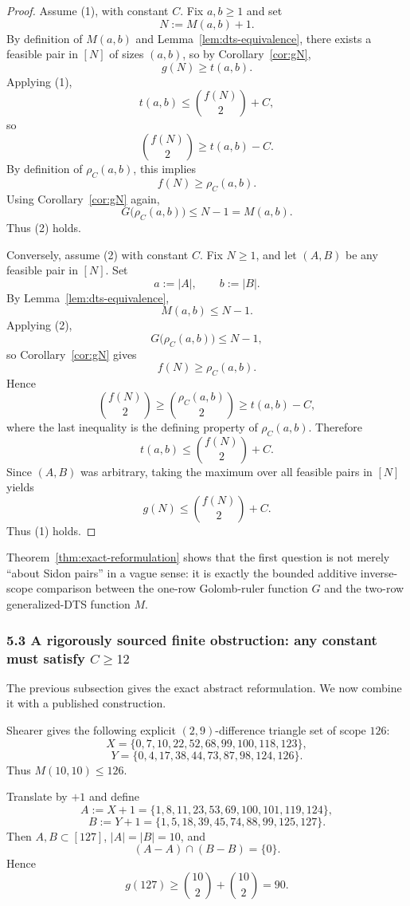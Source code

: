 \begin{proof}
Assume (1), with constant $C$. Fix $a,b\ge 1$ and set
\[
N:=M(a,b)+1.
\]
By definition of $M(a,b)$ and Lemma~\ref{lem:dts-equivalence}, there exists a feasible pair in $[N]$ of sizes $(a,b)$, so by Corollary~\ref{cor:gN},
\[
g(N)\ge t(a,b).
\]
Applying (1),
\[
t(a,b)\le \binom{f(N)}{2}+C,
\]
so
\[
\binom{f(N)}{2}\ge t(a,b)-C.
\]
By definition of $\rho_C(a,b)$, this implies
\[
f(N)\ge \rho_C(a,b).
\]
Using Corollary~\ref{cor:gN} again,
\[
G\bigl(\rho_C(a,b)\bigr)\le N-1=M(a,b).
\]
Thus (2) holds.

Conversely, assume (2) with constant $C$. Fix $N\ge 1$, and let $(A,B)$ be any feasible pair in $[N]$. Set
\[
a:=|A|,\qquad b:=|B|.
\]
By Lemma~\ref{lem:dts-equivalence},
\[
M(a,b)\le N-1.
\]
Applying (2),
\[
G\bigl(\rho_C(a,b)\bigr)\le N-1,
\]
so Corollary~\ref{cor:gN} gives
\[
f(N)\ge \rho_C(a,b).
\]
Hence
\[
\binom{f(N)}{2}\ge \binom{\rho_C(a,b)}{2}\ge t(a,b)-C,
\]
where the last inequality is the defining property of $\rho_C(a,b)$. Therefore
\[
t(a,b)\le \binom{f(N)}{2}+C.
\]
Since $(A,B)$ was arbitrary, taking the maximum over all feasible pairs in $[N]$ yields
\[
g(N)\le \binom{f(N)}{2}+C.
\]
Thus (1) holds.
\end{proof}

\begin{remark}
Theorem~\ref{thm:exact-reformulation} shows that the first question is not merely ``about Sidon pairs'' in a vague sense: it is exactly the bounded additive inverse-scope comparison between the one-row Golomb-ruler function $G$ and the two-row generalized-DTS function $M$.
\end{remark}

\subsubsection{5.3 A rigorously sourced finite obstruction: any constant must satisfy $C\ge 12$}

The previous subsection gives the exact abstract reformulation. We now combine it with a published construction.

Shearer gives the following explicit $(2,9)$-difference triangle set of scope $126$:
\[
X=\{0,7,10,22,52,68,99,100,118,123\},
\]
\[
Y=\{0,4,17,38,44,73,87,98,124,126\}.
\]
Thus $M(10,10)\le 126$.

Translate by $+1$ and define
\[
A:=X+1=\{1,8,11,23,53,69,100,101,119,124\},
\]
\[
B:=Y+1=\{1,5,18,39,45,74,88,99,125,127\}.
\]
Then $A,B\subset [127]$, $|A|=|B|=10$, and
\[
(A-A)\cap(B-B)=\{0\}.
\]
Hence
\[
g(127)\ge \binom{10}{2}+\binom{10}{2}=90.
\]

